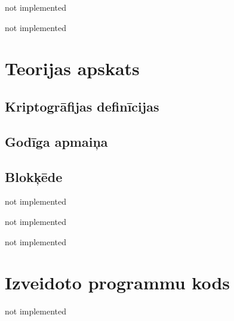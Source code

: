 \documentclass[singlespacing, latexmargins]{ludis}
\begin{document}
\maketitle

\begin{abstract-lv}
    not implemented

\end{abstract-lv}

\begin{abstract-en}
    not implemented

\end{abstract-en}

\tableofcontents





\chapter{Teorijas apskats}


\section{Kriptogrāfijas definīcijas}


\section{Godīga apmaiņa}



\section{Blokķēde}


not implemented

not implemented

not implemented


\appendix
\chapter{Izveidoto programmu kods}
not implemented
\end{document}
